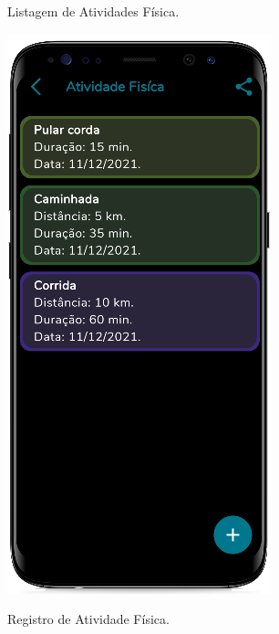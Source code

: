 \begin{figure}[htb]
    \centering
    \begin{minipage}{0.45\textwidth}
        \centering
        \caption{Listagem de Atividades Física.}\label{fig_list_atv_fis}
        \includegraphics[scale=0.66]{Imagens/desenvolvimento/app/list_atv_fis.png}
    \end{minipage}
    \hfill
    \begin{minipage}{0.45\textwidth}
        \centering
        \caption{Registro de Atividade Física.}\label{fig_reg_atv_fis}

\end{minipage}
\end{figure}
